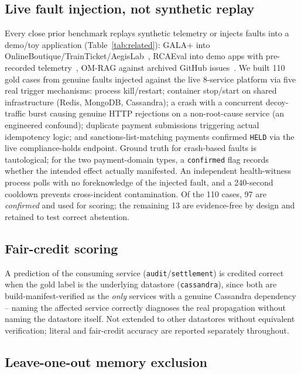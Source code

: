 \documentclass[conference]{IEEEtran}
\begin{document}
\subsection{Live fault injection, not synthetic replay}
\label{sec:live-injection}

Every close prior benchmark replays synthetic telemetry or injects faults into a demo/toy application
(Table~\ref{tab:related}): GALA+ into OnlineBoutique/TrainTicket/AegisLab~\cite{gala}, RCAEval into demo apps
with pre-recorded telemetry~\cite{rcaeval}, OM-RAG against archived GitHub issues~\cite{omrag}. We built 110
gold cases from genuine faults injected against the live 8-service platform via five real trigger mechanisms:
process kill/restart; container stop/start on shared infrastructure (Redis, MongoDB, Cassandra); a crash with a
concurrent decoy-traffic burst causing genuine HTTP rejections on a non-root-cause service (an engineered
confound); duplicate payment submissions triggering actual idempotency logic; and sanctions-list-matching
payments confirmed \texttt{HELD} via the live compliance-holds endpoint. Ground truth for crash-based faults is
tautological; for the two payment-domain types, a \texttt{confirmed} flag records whether the intended effect
actually manifested. An independent health-witness process polls with no foreknowledge of the injected fault,
and a 240-second cooldown prevents cross-incident contamination. Of the 110 cases, 97 are \emph{confirmed} and
used for scoring; the remaining 13 are evidence-free by design and retained to test correct abstention.

\subsection{Fair-credit scoring}
\label{sec:fair-credit}

A prediction of the consuming service (\texttt{audit}/\texttt{settlement}) is credited correct when the gold
label is the underlying datastore (\texttt{cassandra}), since both are build-manifest-verified as the
\emph{only} services with a genuine Cassandra dependency -- naming the affected service correctly diagnoses the
real propagation without naming the datastore itself. Not extended to other datastores without equivalent
verification; literal and fair-credit accuracy are reported separately throughout.

\subsection{Leave-one-out memory exclusion}
\label{sec:leakage}
\end{document}
